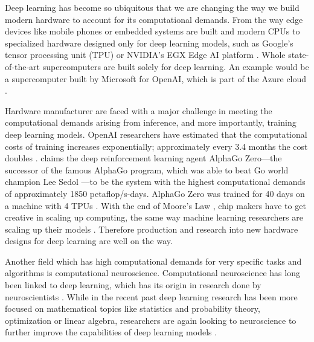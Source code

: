 \documentclass[]{article}
\begin{document}
Deep learning has become so ubiquitous that we are changing the
way we build modern hardware to account for its computational demands.
From the way edge devices like mobile phones or embedded systems are
built \citep{deng_2019} and modern CPUs \citep{perez_2017} to
specialized hardware designed only for deep learning models, such
as Google's tensor processing unit (TPU) \citep{jouppi_et_al_2017} or
NVIDIA's EGX Edge AI platform \citep{boitano_2020}.
Whole state-of-the-art supercomputers are built solely for deep
learning.
An example would be a supercomputer built by Microsoft for OpenAI,
which is part of the Azure cloud \citep{langston_2020}.

Hardware manufacturer are faced with a major challenge in meeting the
computational demands arising from inference, and more importantly,
training deep learning models.
OpenAI researchers have estimated that the computational costs of
training increases exponentially; approximately every 3.4 months the
cost doubles \citep{amodei_et_al_2019}.
\citet{amodei_et_al_2019} claims the deep reinforcement learning agent
AlphaGo Zero---the successor of the famous AlphaGo program, which
was able to beat Go world champion Lee Sedol
\citep{silver_et_al_2017}---to be the system  with the highest
computational demands of approximately 1850 petaflop/s-days.
AlphaGo Zero was trained for 40 days on a machine with 4 TPUs
\citep{silver_et_al_2017}.
With the end of Moore's Law \citep{loeffler_2018}, chip makers have to
get creative in scaling up computing, the same way machine learning
researchers are scaling up their models \citep{simonite_2016}.
Therefore production and research into new hardware designs for deep
learning are well on the way.

Another field which has high computational demands for very specific
tasks and algorithms is computational neuroscience.
Computational neuroscience has long been linked to deep learning,
which has its origin in research done by neuroscientists
\citep{mcculloch_et_al_1943}.
While in the recent past deep learning research has been more focused
on mathematical topics like statistics and probability theory,
optimization or linear algebra, researchers are again looking to
neuroscience to further improve the capabilities of deep
learning models \citep{marblestone_et_al_2016}.
\end{document}
